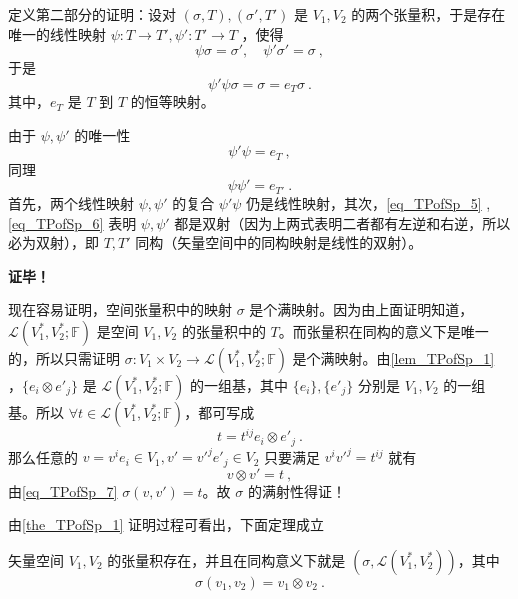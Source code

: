 定义第二部分的证明：设对 $(\sigma,T),(\sigma', T')$ 是 $V_1,V_2$ 的两个张量积，于是存在唯一的线性映射 $\psi:T\rightarrow T',\psi':T'\rightarrow T$ ，使得
\begin{equation}
\psi\sigma=\sigma',\quad\psi'\sigma'=\sigma~,
\end{equation}
于是
\begin{equation}
\psi'\psi\sigma=\sigma=e_T\sigma~.
\end{equation}
其中，$e_T$ 是 $T$ 到 $T$ 的恒等映射。

由于 $\psi,\psi'$ 的唯一性
\begin{equation}\label{eq_TPofSp_5}
\psi'\psi=e_T~,
\end{equation}
同理
\begin{equation}\label{eq_TPofSp_6}
\psi\psi'=e_{T'}~.
\end{equation}
首先，两个线性映射 $\psi,\psi'$ 的复合 $\psi'\psi$ 仍是线性映射，其次，\autoref{eq_TPofSp_5} ,\autoref{eq_TPofSp_6} 表明 $\psi,\psi'$ 都是双射（因为上两式表明二者都有左逆和右逆，所以必为双射），即 $T,T'$ 同构（矢量空间中的同构映射是线性的双射）。

\textbf{证毕！}

现在容易证明，空间张量积中的映射 $\sigma$ 是个满映射。因为由上面证明知道，$\mathcal L(V^*_1,V^*_2;\mathbb F)$ 是空间 $V_1,V_2$ 的张量积中的 $T$。而张量积在同构的意义下是唯一的，所以只需证明 $\sigma:V_1\times V_2\rightarrow \mathcal L(V^*_1,V^*_2;\mathbb F)$ 是个满映射。由\autoref{lem_TPofSp_1} ，$\{e_i\otimes e'_j\}$ 是 $\mathcal L(V^*_1,V^*_2;\mathbb F)$ 的一组基，其中 $\{e_i\},\{e'_j\}$ 分别是 $V_1,V_2$ 的一组基。所以 $\forall t\in \mathcal L(V^*_1,V^*_2;\mathbb F)$，都可写成
\begin{equation}
t=t^{ij}e_i\otimes e'_j~.
\end{equation}
那么任意的 $v=v^i e_i\in V_1,v'=v'^j e'_j\in V_2$ 只要满足 $v^iv'^j=t^{ij}$ 就有
\begin{equation}
v\otimes v'=t~,
\end{equation}
由\autoref{eq_TPofSp_7} $\sigma(v,v')=t$。故 $\sigma$ 的满射性得证！

由\autoref{the_TPofSp_1} 证明过程可看出，下面定理成立
\begin{theorem}{}
矢量空间 $V_1,V_2$ 的张量积存在，并且在同构意义下就是 $(\sigma,\mathcal L(V^*_1,V^*_2))$，其中
\begin{equation}
\sigma(v_1,v_2)=v_1\otimes v_2~.
\end{equation}
\end{theorem}
 
